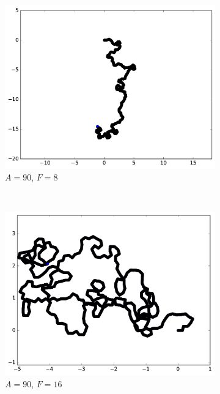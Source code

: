 \begin{appendices}
\begin{figure}[htbp]
\begin{subfigure}[t]{\subImgWmo}
			\includegraphics[width=\textwidth]{figures/ch3/synTraj_219_90_8}
			\caption[$A = 90$, $F=8$]{$A = 90$, $F=8$}
			\label{fig:synTraj_219_90_8}
		\end{subfigure}
		~
		\begin{subfigure}[t]{\subImgWmo}
			\centering
			\includegraphics[width=\textwidth]{figures/ch3/synTraj_219_90_16}
			\caption[$A = 90$, $F=16$]{$A = 90$, $F=16$}
			\label{fig:synTraj_219_90_16}
		\end{subfigure}
		~
		\begin{subfigure}[t]{\subImgWmo}
			\centering

\end{subfigure}
\end{figure}
\end{appendices}

